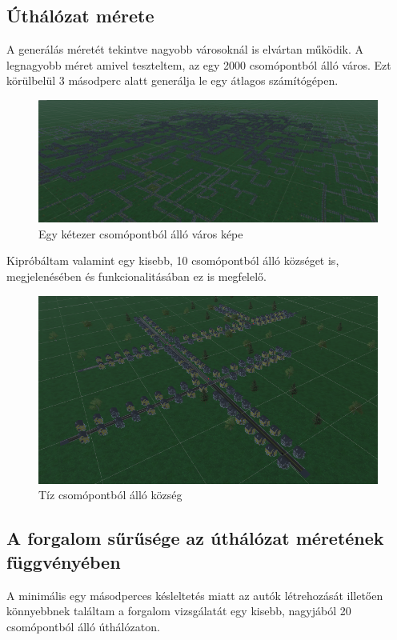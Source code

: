\subsection{Úthálózat mérete}
A generálás méretét tekintve nagyobb városoknál is elvártan működik. A legnagyobb méret amivel teszteltem, az egy 2000 csomópontból álló város. Ezt körülbelül 3 másodperc alatt generálja le egy átlagos számítógépen.
\begin{figure}[H]
\includegraphics[width=\linewidth]{verybig.png}
\caption{Egy kétezer csomópontból álló város képe}
\label{fig:verybigcity}
\end{figure}

Kipróbáltam valamint egy kisebb, 10 csomópontból álló községet is, megjelenésében és funkcionalitásában ez is megfelelő.
\begin{figure}[H]
\includegraphics[width=\linewidth]{village.png}
\caption{Tíz csomópontból álló község}
\label{fig:smalltown}
\end{figure}

\subsection{A forgalom sűrűsége az úthálózat méretének függvényében}
A minimális egy másodperces késleltetés miatt az autók létrehozását illetően könnyebbnek találtam a forgalom vizsgálatát egy kisebb, nagyjából 20 csomópontból álló úthálózaton.

